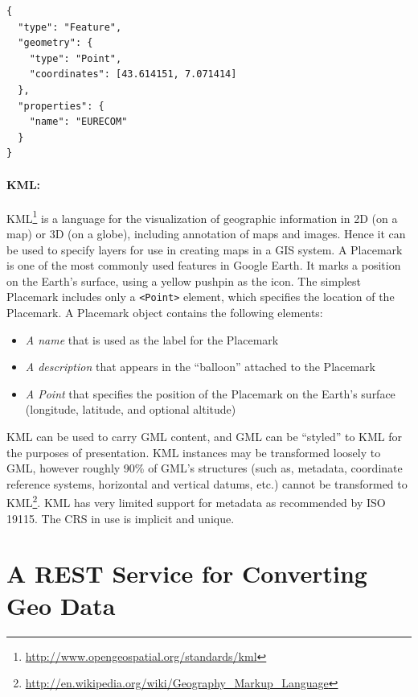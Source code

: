 \begin{verbatim}
{
  "type": "Feature",
  "geometry": {
    "type": "Point",
    "coordinates": [43.614151, 7.071414]
  },
  "properties": {
    "name": "EURECOM"
  }
}
\end{verbatim}

 
 \paragraph{KML:}
KML\footnote{\url{http://www.opengeospatial.org/standards/kml}} is a language for the visualization of geographic information in 2D (on a map) or 3D (on a globe), including annotation of maps and images. Hence it can be used to specify layers for use in creating maps in a GIS system.  A Placemark is one of the most commonly used features in Google Earth. It marks a position on the Earth's surface, using a yellow pushpin as the icon. The simplest Placemark includes only a \texttt{<Point>} element, which specifies the location of the Placemark.
A Placemark object contains the following elements:
\begin{itemize}
\item \textit{A name} that is used as the label for the Placemark
\item \textit{A description} that appears in the ``balloon'' attached to the Placemark
\item \textit{A Point} that specifies the position of the Placemark on the Earth's surface (longitude, latitude, and optional altitude)
\end{itemize}

KML can be used to carry GML content, and GML can be ``styled'' to KML for the purposes of presentation. KML instances may be transformed loosely to GML, however roughly 90\% of GML's structures (such as, metadata, coordinate reference systems, horizontal and vertical datums, etc.) cannot be transformed to KML\footnote{\url{http://en.wikipedia.org/wiki/Geography_Markup_Language}}. KML has very limited support for metadata as recommended by ISO 19115. The CRS in use is implicit and unique.

\section{A REST Service for Converting Geo Data}
\label{sec:rest-service}

